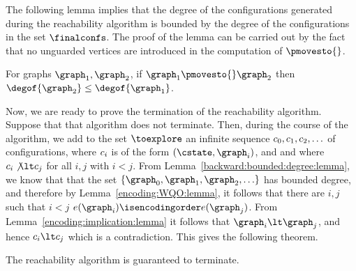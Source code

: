 The following lemma implies that the degree of the configurations generated during the reachability
algorithm is bounded by the degree of the configurations in the set $\finalconfs$.
%
The proof of the lemma can be carried out by the fact that no unguarded vertices
are introduced in the computation of $\pmovesto{}$.
%
\begin{lemma}
\label{backward:bounded:degree:lemma}
For graphs $\graph_1,\graph_2$, if $\graph_1\pmovesto{}\graph_2$
then $\degof{\graph_2}\leq\degof{\graph_1}$.
\end{lemma}
%
Now, we are ready to prove the termination of the reachability algorithm.
%
Suppose that that algorithm does not terminate.
%
Then, during the course of the algorithm, we add to the set
$\toexplore$ an infinite sequence $c_0,c_1,c_2,\ldots$ of configurations,
where $c_i$ is of the form $\tuple{\cstate,\graph_i}$, and
and where $\conf_i\not\lt\conf_j$ for all $i,j$ with $i<j$.
%
From Lemma~\ref{backward:bounded:degree:lemma}, we know that that 
the set $\set{\graph_0,\graph_1,\graph_2,\ldots}$ has bounded degree, and therefore
by Lemma~\ref{encoding:WQO:lemma}, it follows that there
are $i,j$ such that $i<j$ $\encoding(\graph_i)\isencodingorder\encoding(\graph_j)$.
%
From Lemma~\ref{encoding:implication:lemma} it follows that
$\graph_i\lt\graph_j$, and hence $\conf_i\lt\conf_j$ which is a contradiction.
%
This gives the following theorem.
%
\begin{theorem}
The reachability algorithm is guaranteed to terminate.
\end{theorem}

